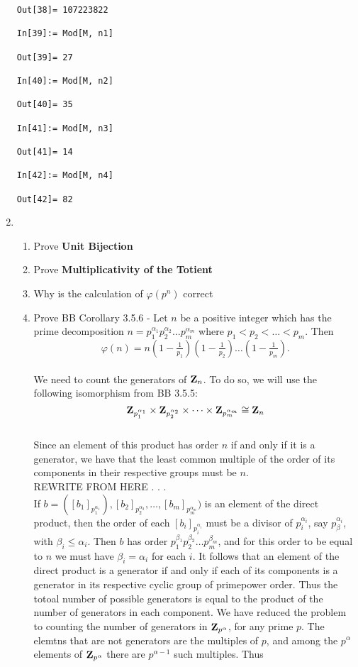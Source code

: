 \documentclass[12pt]{amsart}
\theoremstyle{definition}
\begin{document}
\begin{enumerate}
\begin{verbatim}
Out[38]= 107223822

In[39]:= Mod[M, n1]

Out[39]= 27

In[40]:= Mod[M, n2]

Out[40]= 35

In[41]:= Mod[M, n3]

Out[41]= 14

In[42]:= Mod[M, n4]

Out[42]= 82
\end{verbatim}


\newpage %
\item 
\begin{enumerate}
\item Prove {\bfseries Unit Bijection}
\\
\item Prove {\bfseries Multiplicativity of the Totient}
\\
\item Why is the calculation of $\varphi(p^n)$ correct
\\
\item Prove BB Corollary 3.5.6 - Let $n$ be a positive integer which has the prime decomposition $n = p^{\alpha_1}_1p^{\alpha_2}_2 \dots p^{\alpha_m}_m$ where $p_1 < p_2 < \dots < p_m$.  Then
$$ \varphi(n) = n(1 - \tfrac{1}{p_1})(1 - \tfrac{1}{p_2}) \dots (1 - \tfrac{1}{p_m}).$$
\\
We need to count the generators of $\bold{Z}_n$.  To do so, we will use the following  isomorphism from BB 3.5.5:\\
$$\bold{Z}_{p^{\alpha_1}_1} \times \bold{Z}_{p^{\alpha_2}_2} \times \dots \times \bold{Z}_{p^{\alpha_m}_m} \cong \bold{Z}_n$$\\
Since an element of this product has order $n$ if and only if it is a generator, we have that the least common multiple of the order of its components in their respective groups must be $n$.  
\\
REWRITE FROM HERE . . .
\\
If $b = ([b_1]_{p^{\alpha_1}_1}), [b_2]_{p^{\alpha_2}_2}, \dots ,[b_m]_{p^{\alpha_m}_m})$ is an element of the direct product, then the order of each $[b_i]_{p^{\alpha_i}_i}$ must be a divisor of $p^{\alpha_i}_i$, say ${p^{\alpha_i}_\beta}$, with $\beta_i \leq \alpha_i$.  Then $b$ has order ${p^{\beta_1}_1} {p^{\beta_2}_2} \dots {p^{\beta_m}_m}$, and for this order to be equal to $n$ we must have $\beta_i = \alpha_i$ for each $i$.  It follows that an element of the direct product is a generator if and only if each of its components is a generator in its respective cyclic group of primepower order.  Thus the totoal number of possible generators is equal to the product of the number of generators in each component.  We have reduced the problem to counting the number of generators in $\bold{Z}_{p^\alpha}$, for any prime $p$.  The elemtns that are not generators are the multiples of $p$, and among the $p^\alpha$ elements of $\bold{Z}_{p^\alpha}$ there are $p^{\alpha-1}$ such multiples.  Thus

\end{enumerate}
\end{enumerate}
\end{document}
